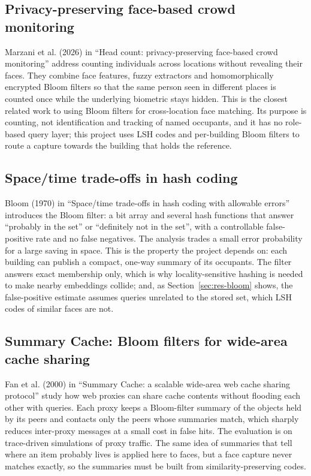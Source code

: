 \documentclass[12pt,a4paper,oneside]{report}
\begin{document}
\clearpage
\subsection{Privacy-preserving face-based crowd monitoring}
Marzani et al. (2026) in ``Head count: privacy-preserving face-based crowd monitoring'' \cite{ref11} address counting individuals across locations without revealing their faces. They combine face features, fuzzy extractors and homomorphically encrypted Bloom filters so that the same person seen in different places is counted once while the underlying biometric stays hidden. This is the closest related work to using Bloom filters for cross-location face matching. Its purpose is counting, not identification and tracking of named occupants, and it has no role-based query layer; this project uses LSH codes and per-building Bloom filters to route a capture towards the building that holds the reference.

\subsection{Space/time trade-offs in hash coding}
Bloom (1970) in ``Space/time trade-offs in hash coding with allowable errors'' \cite{ref12} introduces the Bloom filter: a bit array and several hash functions that answer ``probably in the set'' or ``definitely not in the set'', with a controllable false-positive rate and no false negatives. The analysis trades a small error probability for a large saving in space. This is the property the project depends on: each building can publish a compact, one-way summary of its occupants. The filter answers exact membership only, which is why locality-sensitive hashing is needed to make nearby embeddings collide; and, as Section~\ref{sec:res-bloom} shows, the false-positive estimate assumes queries unrelated to the stored set, which LSH codes of similar faces are not.

\clearpage
\subsection{Summary Cache: Bloom filters for wide-area cache sharing}
Fan et al. (2000) in ``Summary Cache: a scalable wide-area web cache sharing protocol'' \cite{ref13} study how web proxies can share cache contents without flooding each other with queries. Each proxy keeps a Bloom-filter summary of the objects held by its peers and contacts only the peers whose summaries match, which sharply reduces inter-proxy messages at a small cost in false hits. The evaluation is on trace-driven simulations of proxy traffic. The same idea of summaries that tell where an item probably lives is applied here to faces, but a face capture never matches exactly, so the summaries must be built from similarity-preserving codes.
\end{document}
